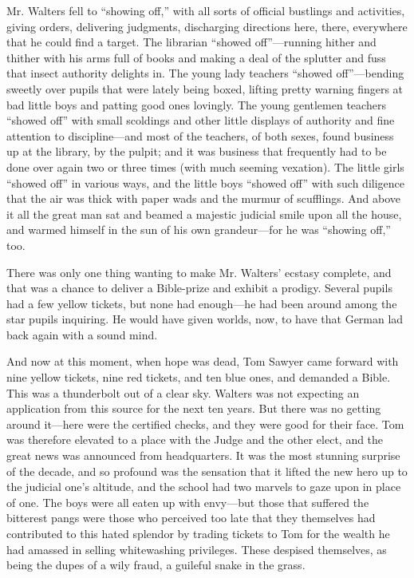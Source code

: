 \documentclass{book}
\begin{document}
Mr. Walters fell to “showing off,” with all sorts of official bustlings and activities, giving orders, delivering judgments, discharging directions here, there, everywhere that he could find a target. The librarian “showed off”—running hither and thither with his arms full of books and making a deal of the splutter and fuss that insect authority delights in. The young lady teachers “showed off”—bending sweetly over pupils that were lately being boxed, lifting pretty warning fingers at bad little boys and patting good ones lovingly. The young gentlemen teachers “showed off” with small scoldings and other little displays of authority and fine attention to discipline—and most of the teachers, of both sexes, found business up at the library, by the pulpit; and it was business that frequently had to be done over again two or three times (with much seeming vexation). The little girls “showed off” in various ways, and the little boys “showed off” with such diligence that the air was thick with paper wads and the murmur of scufflings. And above it all the great man sat and beamed a majestic judicial smile upon all the house, and warmed himself in the sun of his own grandeur—for he was “showing off,” too.

There was only one thing wanting to make Mr. Walters’ ecstasy complete, and that was a chance to deliver a Bible-prize and exhibit a prodigy. Several pupils had a few yellow tickets, but none had enough—he had been around among the star pupils inquiring. He would have given worlds, now, to have that German lad back again with a sound mind.

And now at this moment, when hope was dead, Tom Sawyer came forward with nine yellow tickets, nine red tickets, and ten blue ones, and demanded a Bible. This was a thunderbolt out of a clear sky. Walters was not expecting an application from this source for the next ten years. But there was no getting around it—here were the certified checks, and they were good for their face. Tom was therefore elevated to a place with the Judge and the other elect, and the great news was announced from headquarters. It was the most stunning surprise of the decade, and so profound was the sensation that it lifted the new hero up to the judicial one’s altitude, and the school had two marvels to gaze upon in place of one. The boys were all eaten up with envy—but those that suffered the bitterest pangs were those who perceived too late that they themselves had contributed to this hated splendor by trading tickets to Tom for the wealth he had amassed in selling whitewashing privileges. These despised themselves, as being the dupes of a wily fraud, a guileful snake in the grass.
\end{document}
